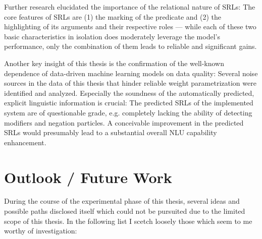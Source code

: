 Further research elucidated the importance of the relational nature of SRLs: The core
features of SRLs are (1) the marking of the predicate and (2) the highlighting of its
arguments and their respective roles --- while each of these two basic characteristics
in isolation does moderately leverage the model's performance, only the combination of
them leads to reliable and significant gains.

Another key insight of this thesis is the confirmation of the well-known dependence of data-driven
machine learning models on data quality: Several noise sources in the data of this thesis that
hinder reliable weight parametrization were identified and analyzed. Especially the soundness of
the automatically predicted, explicit linguistic information is crucial: The predicted SRLs of the
implemented system are of questionable grade, e.g. completely lacking the ability of detecting
modifiers and negation particles. A conceivable improvement in the predicted SRLs would presumably
lead to a substantial overall NLU capability enhancement.





\section*{Outlook / Future Work}

During the course of the experimental phase of this thesis, several ideas and possible paths
disclosed itself which could not be pursuited due to the limited scope of this thesis. In the
following list I scetch loosely those which seem to me worthy of investigation:

